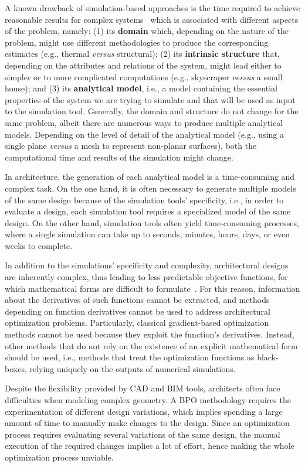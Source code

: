 	A known drawback of simulation-based approaches is the time required to achieve reasonable results for complex systems~\cite{Law1991} which is associated with different aspects of the problem, namely: (1) its \textbf{domain} which, depending on the nature of the problem, might use different methodologies to produce the corresponding estimates (e.g., thermal \textit{versus} structural); (2) its \textbf{intrinsic structure} that, depending on the attributes and relations of the system, might lead either to simpler or to more complicated computations (e.g., skyscraper \textit{versus} a small house); and (3) its \textbf{analytical model}, i.e., a model containing the essential properties of the system we are trying to simulate and that will be used as input to the simulation tool. Generally, the domain and structure do not change for the same problem, albeit there are numerous ways to produce multiple analytical models. Depending on the level of detail of the analytical model (e.g., using a single plane \textit{versus} a mesh to represent non-planar surfaces), both the computational time and results of the simulation might change. 

	In architecture, the generation of each analytical model is a time-consuming and complex task. On the one hand, it is often necessary to generate multiple models of the same design because of the simulation tools' specificity, i.e., in order to evaluate a design, each simulation tool requires a specialized model of the same design. On the other hand, simulation tools often yield time-consuming processes, where a single simulation can take up to seconds, minutes, hours, days, or even weeks to complete. 
	
	In addition to the simulations' specificity and complexity, architectural designs are inherently complex, thus leading to less predictable objective functions, for which mathematical forms are difficult to formulate~\cite{Machairas2014}. For this reason, information about the derivatives of such functions cannot be extracted, and methods depending on function derivatives cannot be used to address architectural optimization problems. Particularly, classical gradient-based optimization methods cannot be used because they exploit the function's derivatives. Instead, other methods that do not rely on the existence of an explicit mathematical form should be used, i.e., methods that treat the optimization functions as black-boxes, relying uniquely on the outputs of numerical simulations.
	
	Despite the flexibility provided by \ac{CAD} and \ac{BIM} tools, architects often face difficulties when modeling complex geometry. A \ac{BPO} methodology requires the experimentation of different design variations, which implies spending a large amount of time to manually make changes to the design. Since an optimization process requires evaluating several variations of the same design, the manual execution of the required changes implies a lot of effort, hence making the whole optimization process unviable.
	
